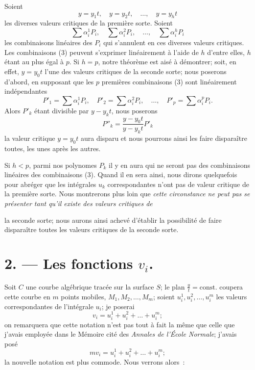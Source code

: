 \documentclass{article}
\begin{document}
Soient
\[
y = y_{1} t, \quad y = y_{2} t, \quad \ldots, \quad y = y_{h} t
\]
les diverses valeurs critiques de la première sorte. Soient
\[
\sum \alpha_{i}^{1} P_{i}, \quad \sum \alpha_{i}^{2} P_{i}, \quad \ldots, \quad \sum \alpha_{i}^{h} P_{i} \tag{3}
\]
les combinaisons linéaires des $P_{i}$ qui s'annulent en ces diverses valeurs critiques. Les combinaisons (3) peuvent s'exprimer linéairement à l'aide de $h$ d'entre elles, $h$ étant au plus égal à $p$. Si $h = p$, notre théorème est aisé à démontrer; soit, en effet, $y = y_{0} t$ l'une des valeurs critiques de la seconde sorte; nous poserons d'abord, en supposant que les $p$ premières combinaisons (3) sont linéairement indépendantes
\[
P'_{1} = \sum \alpha_{i}^{1} P_{i}, \quad P'_{2} = \sum \alpha_{i}^{2} P_{i}, \quad \ldots, \quad P'_{p} = \sum \alpha_{i}^{p} P_{i}.
\]
Alors $P'_{k}$ étant divisible par $y - y_{k} t$, nous poserons
\[
P''_{k} = \frac{y - y_{0} t}{y - y_{k} t} P'_{k}
\]
la valeur critique $y = y_{0} t$ aura disparu et nous pourrons ainsi les faire disparaître toutes, les unes après les autres.

Si $h < p$, parmi nos polynomes $P_{k}$ il y en aura qui ne seront pas des combinaisons linéaires des combinaisons (3). Quand il en sera ainsi, nous dirons quelquefois pour abréger que les intégrales $u_{k}$ correspondantes n'ont pas de valeur critique de la première sorte. Nous montrerons plus loin que \emph{cette circonstance ne peut pas se présenter tant qu'il existe des valeurs critiques de}

la seconde sorte; nous aurons ainsi achevé d'établir la possibilité de faire disparaître toutes les valeurs critiques de la seconde sorte.

\section*{2. --- Les fonctions $v_{i}$.}

Soit $C$ une courbe algébrique tracée sur la surface $S$; le plan $\frac{y}{t} = \text{const.}$ coupera cette courbe en $m$ points mobiles, $M_{1}, M_{2}, \ldots, M_{m}$; soient $u_{i}^{1}, u_{i}^{2}, \ldots, u_{i}^{m}$ les valeurs correspondantes de l'intégrale $u_{i}$; je poserai
\[
v_{i} = u_{i}^{1} + u_{i}^{2} + \ldots + u_{i}^{m}; \tag{1}
\]
on remarquera que cette notation n'est pas tout à fait la même que celle que j'avais employée dans le Mémoire cité des \emph{Annales de l'École Normale}; j'avais posé
\[
m v_{i} = u_{i}^{1} + u_{i}^{2} + \ldots + u_{i}^{m};
\]
la nouvelle notation est plus commode. Nous verrons alors~:
\end{document}
